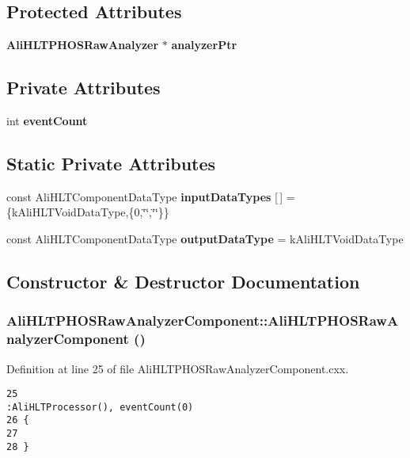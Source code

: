 \subsection*{Protected Attributes}
\begin{CompactItemize}
\item 
{\bf Ali\-HLTPHOSRaw\-Analyzer} $\ast$ {\bf analyzer\-Ptr}
\end{CompactItemize}
\subsection*{Private Attributes}
\begin{CompactItemize}
\item 
int {\bf event\-Count}
\end{CompactItemize}
\subsection*{Static Private Attributes}
\begin{CompactItemize}
\item 
const Ali\-HLTComponent\-Data\-Type {\bf input\-Data\-Types} [$\,$] = \{k\-Ali\-HLTVoid\-Data\-Type,\{0,\char`\"{}\char`\"{},\char`\"{}\char`\"{}\}\}
\item 
const Ali\-HLTComponent\-Data\-Type {\bf output\-Data\-Type} = k\-Ali\-HLTVoid\-Data\-Type
\end{CompactItemize}


\subsection{Constructor \& Destructor Documentation}
\subsubsection{\setlength{\rightskip}{0pt plus 5cm}Ali\-HLTPHOSRaw\-Analyzer\-Component::Ali\-HLTPHOSRaw\-Analyzer\-Component ()}\label{classAliHLTPHOSRawAnalyzerComponent_AliHLTPHOSRawAnalyzerComponenta0}




Definition at line 25 of file Ali\-HLTPHOSRaw\-Analyzer\-Component.cxx.

\footnotesize\begin{verbatim}25                                                               :AliHLTProcessor(), eventCount(0)
26 {
27 
28 } 
\end{verbatim}\normalsize 


